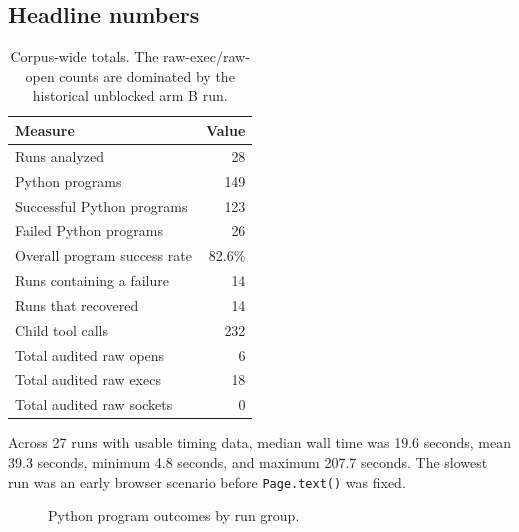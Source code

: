 \documentclass[11pt]{article}
\newcommand{\code}[1]{\texttt{#1}}
\begin{document}
\subsection{Headline numbers}

\begin{table}[h]
\centering
\begin{tabular}{lr}
\toprule
\textbf{Measure} & \textbf{Value} \\
\midrule
Runs analyzed & 28 \\
Python programs & 149 \\
Successful Python programs & 123 \\
Failed Python programs & 26 \\
Overall program success rate & 82.6\% \\
Runs containing a failure & 14 \\
Runs that recovered & 14 \\
Child tool calls & 232 \\
Total audited raw opens & 6 \\
Total audited raw execs & 18 \\
Total audited raw sockets & 0 \\
\bottomrule
\end{tabular}
\caption{Corpus-wide totals.  The raw-exec/raw-open counts are dominated by the
historical unblocked arm B run.}
\end{table}

Across 27 runs with usable timing data, median wall time was 19.6 seconds, mean
39.3 seconds, minimum 4.8 seconds, and maximum 207.7 seconds.  The slowest run
was an early browser scenario before \code{Page.text()} was fixed.

\begin{figure}[h]
\centering
{}
\caption{Python program outcomes by run group.}
\end{figure}
\end{document}
